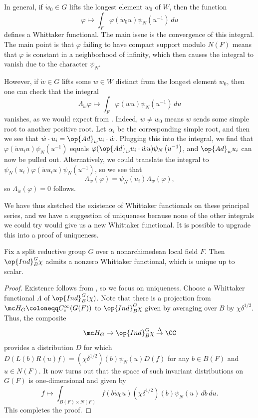 \documentclass[../notes.tex]{subfiles}
\begin{document}
\begin{remark} \label{rem:whittaker-exists}
	In general, if $\dot w_0\in G$ lifts the longest element $w_0$ of $W$, then the function
	\[\varphi\mapsto\int_{F}\varphi(\dot w_0u)\psi_N\left(u^{-1}\right)\,du\]
	defines a Whittaker functional. The main issue is the convergence of this integral. The main point is that $\varphi$ failing to have compact support modulo $N(F)$ means that $\varphi$ is constant in a neighborhood of infinity, which then causes the integral to vanish due to the character $\psi_N$.
\end{remark}
\begin{remark} \label{rem:almost-uniqueness-whittaker}
	However, if $\dot w\in G$ lifts some $w\in W$ distinct from the longest element $w_0$, then one can check that the integral
	\[\Lambda_{\dot w}\varphi\mapsto\int_{F}\varphi(\dot wu)\psi_N\left(u^{-1}\right)\,du\]
	vanishes, as we would expect from . Indeed, $w\ne w_0$ means $w$ sends some simple root to another positive root. Let $\alpha_i$ be the corresponding simple root, and then we see that $\dot w\cdot u_i=\op{Ad}_wu_i\cdot\dot w$. Plugging this into the integral, we find that $\varphi(\dot wu_iu)\psi_N\left(u^{-1}\right)$ equals $\varphi(\op{Ad}_wu_i\cdot\dot wu)\psi_N\left(u^{-1}\right)$, and $\op{Ad}_wu_i$ can now be pulled out. Alternatively, we could translate the integral to $\psi_N(u_i)\varphi(\dot wu_iu)\psi_N\left(u^{-1}\right)$, so we see that
	\[\Lambda_{\dot w}(\varphi)=\psi_N(u_i)\Lambda_{\dot w}(\varphi),\]
	so $\Lambda_{\dot w}(\varphi)=0$ follows.
\end{remark}
We have thus sketched the existence of Whittaker functionals on these principal series, and we have a suggestion of uniqueness because none of the other integrals we could try would give us a new Whittaker functional. It is possible to upgrade this into a proof of uniqueness.
\begin{proposition} \label{prop:whittaker-principal-series}
	Fix a split reductive group $G$ over a nonarchimedean local field $F$. Then $\op{Ind}_B^G\chi$ admits a nonzero Whittaker functional, which is unique up to scalar.
\end{proposition}
\begin{proof}
	Existence follows from , so we focus on uniqueness. Choose a Whittaker functional $\Lambda$ of $\op{Ind}_B^G(\chi)$. Note that there is a projection from $\mc H_G\coloneqq C_c^\infty(G(F))$ to $\op{Ind}_B^G\chi$ given by averaging over $B$ by $\chi\delta^{1/2}$. Thus, the composite
	\[\mc H_G\to\op{Ind}_B^G\chi\stackrel\Lambda\to\CC\]
	provides a distribution $D$ for which $D(L(b)R(u)f)=(\chi\delta^{1/2})(b)\psi_N(u)D(f)$ for any $b\in B(F)$ and $u\in N(F)$. It now turns out that the space of such invariant distributions on $G(F)$ is one-dimensional and given by
	\[f\mapsto\int_{B(F)\times N(F)}f(b\dot w_0u)\left(\chi\delta^{1/2}\right)(b)\psi_N(u)\,db\,du.\]
	This completes the proof.
\end{proof}
\end{document}
